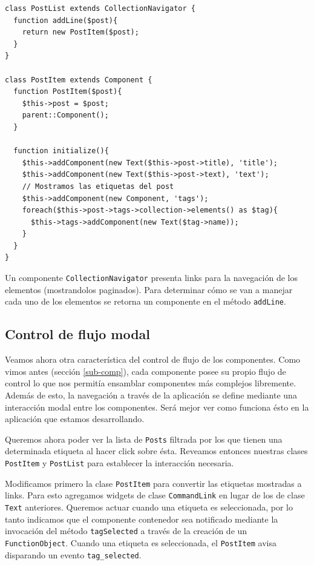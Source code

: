 \begin{verbatim}
class PostList extends CollectionNavigator {
  function addLine($post){
    return new PostItem($post);
  }
}

class PostItem extends Component {
  function PostItem($post){
    $this->post = $post;
    parent::Component();
  }

  function initialize(){
    $this->addComponent(new Text($this->post->title), 'title');
    $this->addComponent(new Text($this->post->text), 'text');
    // Mostramos las etiquetas del post
    $this->addComponent(new Component, 'tags');
    foreach($this->post->tags->collection->elements() as $tag){
      $this->tags->addComponent(new Text($tag->name));
    }
  }
}

\end{verbatim}

Un componente \verb"CollectionNavigator" presenta links para la navegación de los elementos (mostrandolos paginados). Para determinar cómo se van a manejar cada uno de los elementos se retorna un componente en el método \verb"addLine".

\subsection{Control de flujo modal}
\label{sub-modal-flow}
Veamos ahora otra característica del control de flujo de los componentes. Como vimos antes (sección \ref{sub-comp}), cada componente posee su propio flujo de control lo que nos permitía ensamblar componentes más complejos libremente. Además de esto, la navegación a través de la aplicación se define mediante una interacción modal entre los componentes. Será mejor ver como funciona ésto en la aplicación que estamos desarrollando.

Queremos ahora poder ver la lista de \verb"Posts" filtrada por los que tienen una determinada etiqueta al hacer click sobre ésta. Reveamos entonces nuestras clases \verb"PostItem" y \verb"PostList" para establecer la interacción necesaria.

Modificamos primero la clase \verb"PostItem" para convertir las etiquetas mostradas a links. Para esto agregamos widgets de clase \verb"CommandLink" en lugar de los de clase \verb"Text" anteriores. Queremos actuar cuando una etiqueta es seleccionada, por lo tanto indicamos que el componente contenedor sea notificado mediante la invocación del método \verb"tagSelected" a través de la creación de un \verb"FunctionObject". Cuando una etiqueta es seleccionada, el \verb"PostItem" avisa disparando  un evento \verb"tag_selected".

